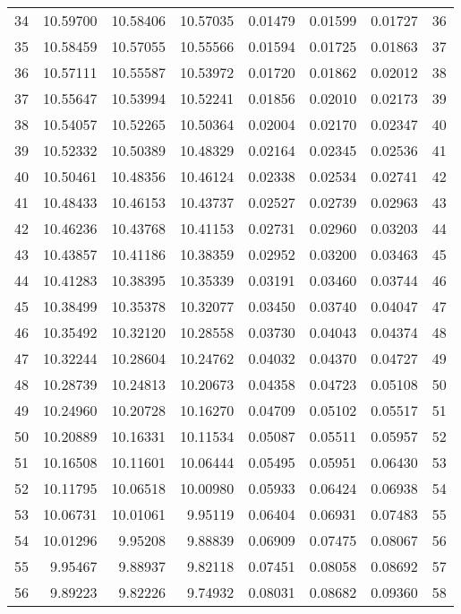 \documentclass[12pt]{article}
\begin{document}
\begin{longtable}{rrrrrrrr}
  34 & 10.59700 & 10.58406 & 10.57035 & 0.01479 & 0.01599 & 0.01727 & 36 \\ 
  35 & 10.58459 & 10.57055 & 10.55566 & 0.01594 & 0.01725 & 0.01863 & 37 \\ 
  36 & 10.57111 & 10.55587 & 10.53972 & 0.01720 & 0.01862 & 0.02012 & 38 \\ 
  37 & 10.55647 & 10.53994 & 10.52241 & 0.01856 & 0.02010 & 0.02173 & 39 \\ 
  38 & 10.54057 & 10.52265 & 10.50364 & 0.02004 & 0.02170 & 0.02347 & 40 \\ 
  39 & 10.52332 & 10.50389 & 10.48329 & 0.02164 & 0.02345 & 0.02536 & 41 \\ 
  40 & 10.50461 & 10.48356 & 10.46124 & 0.02338 & 0.02534 & 0.02741 & 42 \\ 
  41 & 10.48433 & 10.46153 & 10.43737 & 0.02527 & 0.02739 & 0.02963 & 43 \\ 
  42 & 10.46236 & 10.43768 & 10.41153 & 0.02731 & 0.02960 & 0.03203 & 44 \\ 
  43 & 10.43857 & 10.41186 & 10.38359 & 0.02952 & 0.03200 & 0.03463 & 45 \\ 
  44 & 10.41283 & 10.38395 & 10.35339 & 0.03191 & 0.03460 & 0.03744 & 46 \\ 
  45 & 10.38499 & 10.35378 & 10.32077 & 0.03450 & 0.03740 & 0.04047 & 47 \\ 
  46 & 10.35492 & 10.32120 & 10.28558 & 0.03730 & 0.04043 & 0.04374 & 48 \\ 
  47 & 10.32244 & 10.28604 & 10.24762 & 0.04032 & 0.04370 & 0.04727 & 49 \\ 
  48 & 10.28739 & 10.24813 & 10.20673 & 0.04358 & 0.04723 & 0.05108 & 50 \\ 
  49 & 10.24960 & 10.20728 & 10.16270 & 0.04709 & 0.05102 & 0.05517 & 51 \\ 
  50 & 10.20889 & 10.16331 & 10.11534 & 0.05087 & 0.05511 & 0.05957 & 52 \\ 
  51 & 10.16508 & 10.11601 & 10.06444 & 0.05495 & 0.05951 & 0.06430 & 53 \\ 
  52 & 10.11795 & 10.06518 & 10.00980 & 0.05933 & 0.06424 & 0.06938 & 54 \\ 
  53 & 10.06731 & 10.01061 & 9.95119 & 0.06404 & 0.06931 & 0.07483 & 55 \\ 
  54 & 10.01296 & 9.95208 & 9.88839 & 0.06909 & 0.07475 & 0.08067 & 56 \\ 
  55 & 9.95467 & 9.88937 & 9.82118 & 0.07451 & 0.08058 & 0.08692 & 57 \\ 
  56 & 9.89223 & 9.82226 & 9.74932 & 0.08031 & 0.08682 & 0.09360 & 58 \\ 

\end{longtable}
\end{document}
